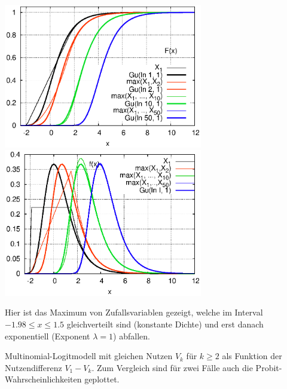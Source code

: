 \documentclass[a4paper]{foils}
\begin{document}
\begin{landscape}
\begin{center}
\newpage
\vspace{1em}

 \includegraphics[width=0.65\textwidth]{./figsDiscr/gumbelGrenz2_F.eps}   
 \includegraphics[width=0.65\textwidth]{./figsDiscr/gumbelGrenz2_f.eps}   
\vspace{1em}

\parbox{1.1\textwidth}{Hier ist das Maximum von
Zufallsvariablen gezeigt, welche im Interval $-1.98 \le x \le 1.5$
gleichverteilt sind (konstante Dichte) und erst danach exponentiell
(Exponent $\lambda=1$) abfallen.
}
\newpage
\vspace{0em}
\parbox{1.3\textwidth}{Multinomial-Logitmodell mit
gleichen Nutzen $V_k$ f\"ur $k\ge 2$ als Funktion der Nutzendifferenz
$V_1-V_k$.
Zum Vergleich sind f\"ur zwei F\"alle auch die
Probit-Wahrscheinlichkeiten geplottet. 
}

\newpage
\vspace{1em}


\end{center}
\end{landscape}
\end{document}
